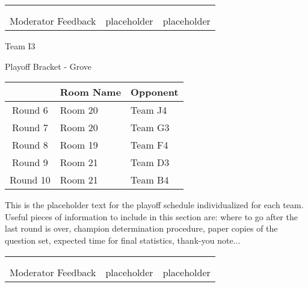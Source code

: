 \documentclass{article}%
\begin{document}
\newline%
%
\begin{tabularx}{\textwidth}{YYY}%
  &  &  \\%
\\%
Moderator Feedback&placeholder&placeholder\\%
\end{tabularx}%
\newpage%
\begin{center}%
\begin{Huge}%
Team I3%
\end{Huge}%
\vspace*{12pt}%
\linebreak%
\begin{Large}%
Playoff Bracket {-} Grove%
\end{Large}%
\end{center}%
\vspace*{4pt}%
%
\begin{tabularx}{\textwidth}{|c|Y|Y|}%
\hline%
&Room Name&Opponent\\%
\hline%
Round 6&Room 20&Team J4\\%
Round 7&Room 20&Team G3\\%
Round 8&Room 19&Team F4\\%
Round 9&Room 21&Team D3\\%
Round 10&Room 21&Team B4\\%
\hline%
\end{tabularx}%
\vspace*{30pt}%
\linebreak%
This is the placeholder text for the playoff schedule individualized for each team. Useful pieces of information to include in this section are: where to go after the last round is over, champion determination procedure, paper copies of the question set, expected time for final statistics, thank{-}you note...%
\vspace*{30pt}%
\newline%
%
\begin{tabularx}{\textwidth}{YYY}%
  &  &  \\%
\\%
Moderator Feedback&placeholder&placeholder\\%
\end{tabularx}%
\end{document}
